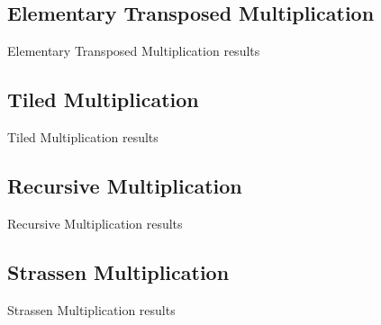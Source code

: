 \documentclass[12pt, a4paper]{article}
\begin{document}
\subsection{Elementary Transposed Multiplication}
\begin{table}[p]
\begin{center}
\label{tbl:horse_trans}

\caption{Elementary Transposed Multiplication results}
\end{center}
\end{table}

\subsection{Tiled Multiplication}
\begin{table}[p]
\begin{center}
\label{tbl:horse_tiled}

\caption{Tiled Multiplication results}
\end{center}
\end{table}

\subsection{Recursive Multiplication}
\begin{table}[p]
\begin{center}
\label{tbl:horse_rec}

\caption{Recursive Multiplication results}
\end{center}
\end{table}

\subsection{Strassen Multiplication}
\begin{table}[p]
\begin{center}
\label{tbl:horse_strassen}

\caption{Strassen Multiplication results}
\end{center}
\end{table}
\end{document}
